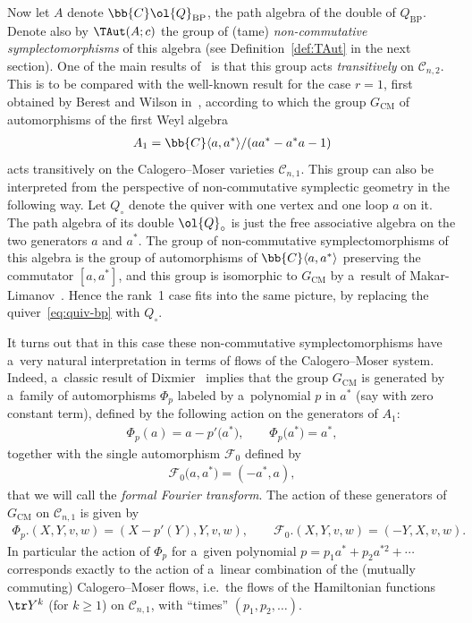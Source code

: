 Now let \(A\) denote \(\bb{C}\ol{Q}_{\mathrm{BP}}\), the path algebra of the double of \(Q_{\mathrm{BP}}\).
Denote also by \(\TAut(A;c)\) the group of (tame) \emph{non-commutative symplectomorphisms} of this algebra
(see Def\/inition~\ref{def:TAut} in the next section).
One of the main results of~\cite{bp08} is that this group acts \emph{transitively} on \(\mathcal{C}_{n,2}\).
This is to be compared with the well-known result for the case \(r=1\), f\/irst obtained by Berest and
Wilson in~\cite{bw00}, according to which the group \(G_{\mathrm{CM}}\) of automorphisms of the f\/irst
Weyl algebra
\begin{gather*}
A_{1}=\bb{C}\langle a,a^{*}\rangle/(aa^{*}-a^{*}a-1)
\end{gather*}
acts transitively on the Calogero--Moser varieties \(\mathcal{C}_{n,1}\).
This group can also be interpreted from the perspective of non-commutative symplectic geometry in the
following way.
Let \(Q_{\circ}\) denote the quiver with one vertex and one loop \(a\) on it.
The path algebra of its double \(\ol{Q}_{\circ}\) is just the free associative algebra on the two
generators \(a\) and \(a^{*}\).
The group of non-commutative symplectomorphisms of this algebra is the group of automorphisms of
\(\bb{C}\langle a,a^{*}\rangle\) preserving the commutator \([a,a^{*}]\), and this group is isomorphic to
\(G_{\mathrm{CM}}\) by a~result of Makar-Limanov~\cite{ml84, ml70}.
Hence the rank~1 case f\/its into the same picture, by replacing the quiver~\eqref{eq:quiv-bp} with
\(Q_{\circ}\).

It turns out that in this case these non-commutative symplectomorphisms have a~very natural interpretation
in terms of f\/lows of the Calogero--Moser system.
Indeed, a~classic result of Dixmier~\cite{dix68} implies that the group \(G_{\mathrm{CM}}\) is generated by
a~family of automorphisms \(\Phi_{p}\) labeled by a~polynomial \(p\) in \(a^{*}\) (say with zero constant
term), def\/ined by the following action on the generators of \(A_{1}\):
\begin{gather}
\label{eq:def-cmflows}
\Phi_{p}(a)=a-p'\big(a^{*}\big),
\qquad
\Phi_{p}\big(a^{*}\big)=a^{*},
\end{gather}
together with the single automorphism \(\mathcal{F}_{0}\) def\/ined by
\begin{gather}
\label{eq:fft0}
\mathcal{F}_{0}\big(a,a^{*}\big)=(-a^{*},a),
\end{gather}
that we will call the \emph{formal Fourier transform}.
The action of these generators of \(G_{\mathrm{CM}}\) on \(\mathcal{C}_{n,1}\) is given by
\begin{gather*}
\Phi_{p}.(X,Y,v,w)=(X-p'(Y),Y,v,w),
\qquad
\mathcal{F}_{0}.(X,Y,v,w)=(-Y,X,v,w).
\end{gather*}
In particular the action of \(\Phi_{p}\) for a~given polynomial \(p = p_{1}a^{*} + p_{2}a^{*2} + \cdots\)
corresponds exactly to the action of a~linear combination of the (mutually commuting) Calogero--Moser
f\/lows, i.e.\
the f\/lows of the Hamiltonian functions \(\tr Y^{k}\) (for \(k\geq 1\)) on \(\mathcal{C}_{n,1}\), with
``times'' \((p_{1}, p_{2}, \dots)\).


